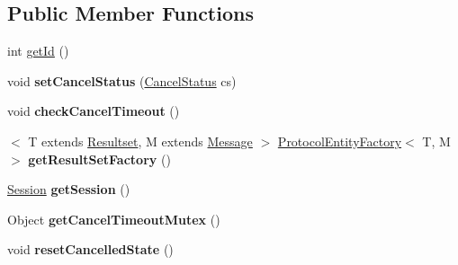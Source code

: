 \subsection*{Public Member Functions}
\begin{DoxyCompactItemize}
\item 
int \mbox{\hyperlink{interfacecom_1_1mysql_1_1cj_1_1_query_a29f450bbae1063765d434e3b89bdd26e}{get\+Id}} ()
\item 
\mbox{\label{interfacecom_1_1mysql_1_1cj_1_1_query_ad88d55a91d45f0e133f0ffe7a279b258}} 
void {\bfseries set\+Cancel\+Status} (\mbox{\hyperlink{enumcom_1_1mysql_1_1cj_1_1_query_1_1_cancel_status}{Cancel\+Status}} cs)
\item 
\mbox{\label{interfacecom_1_1mysql_1_1cj_1_1_query_add91f39e25b2687d5ae8637d59e470f5}} 
void {\bfseries check\+Cancel\+Timeout} ()
\item 
\mbox{\label{interfacecom_1_1mysql_1_1cj_1_1_query_a65a08bc19f00ca6ae30fa9d7666e9f51}} 
$<$ T extends \mbox{\hyperlink{interfacecom_1_1mysql_1_1cj_1_1protocol_1_1_resultset}{Resultset}}, M extends \mbox{\hyperlink{interfacecom_1_1mysql_1_1cj_1_1protocol_1_1_message}{Message}} $>$ \mbox{\hyperlink{interfacecom_1_1mysql_1_1cj_1_1protocol_1_1_protocol_entity_factory}{Protocol\+Entity\+Factory}}$<$ T, M $>$ {\bfseries get\+Result\+Set\+Factory} ()
\item 
\mbox{\label{interfacecom_1_1mysql_1_1cj_1_1_query_ad9657ad6282e8cccd264dccb9b1204a5}} 
\mbox{\hyperlink{interfacecom_1_1mysql_1_1cj_1_1_session}{Session}} {\bfseries get\+Session} ()
\item 
\mbox{\label{interfacecom_1_1mysql_1_1cj_1_1_query_af99b8945b78c6f6cec21d9a81e227d1e}} 
Object {\bfseries get\+Cancel\+Timeout\+Mutex} ()
\item 
\mbox{\label{interfacecom_1_1mysql_1_1cj_1_1_query_a382965ca9799730bbfd58c83facd98b5}} 
void {\bfseries reset\+Cancelled\+State} ()
\item 
\mbox{\label{interfacecom_1_1mysql_1_1cj_1_1_query_a5808add7bd2bffa44c7532995b16e442}} 

\end{DoxyCompactItemize}
